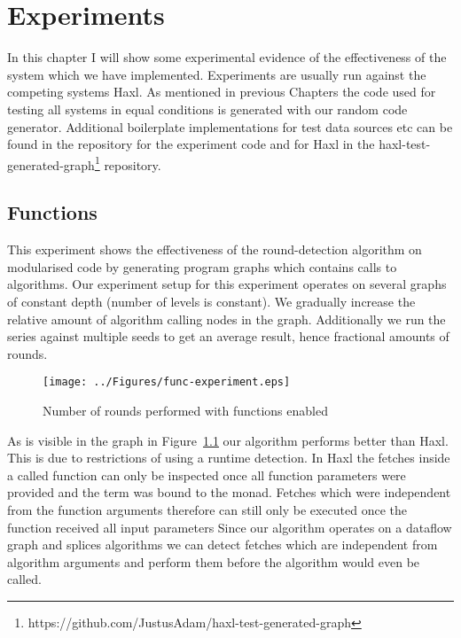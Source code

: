 \chapter{Experiments}

\label{ch:Experiments}

In this chapter I will show some experimental evidence of the effectiveness of the system which we have implemented.
Experiments are usually run against the competing systems Haxl\cite{Haxl:library:link}.
As mentioned in previous Chapters the code used for testing all systems in equal conditions is generated with our random code generator\cite{Goens-rand-code-graph}.
Additional boilerplate implementations for test data sources etc can be found in the \yauhau{} repository\cite{Yauhau:repository:link} for the \yauhau{} experiment code and for Haxl in the haxl-test-generated-graph\footnote{https://github.com/JustusAdam/haxl-test-generated-graph} repository.

\section{Functions}

This experiment shows the effectiveness of the round-detection algorithm on modularised code by generating program graphs which contains calls to algorithms.
Our experiment setup for this experiment operates on several graphs of constant depth (number of levels is constant).
We gradually increase the relative amount of algorithm calling nodes in the graph.
Additionally we run the series against multiple seeds to get an average result, hence fractional amounts of rounds.

\begin{figure}[h]
    \texttt{[image: ../Figures/func-experiment.eps]}
    \caption{Number of rounds performed with functions enabled}
    \label{fig:experiment-functions}
\end{figure}

As is visible in the graph in Figure~\ref{fig:experiment-functions} our algorithm performs better than Haxl.
This is due to restrictions of using a runtime detection.
In Haxl the fetches inside a called function can only be inspected once all function parameters were provided and the term was bound to the monad.
Fetches which were independent from the function arguments therefore can still only be executed once the function received all input parameters
Since our algorithm operates on a dataflow graph and splices algorithms we can detect fetches which are independent from algorithm arguments and perform them before the algorithm would even be called.

